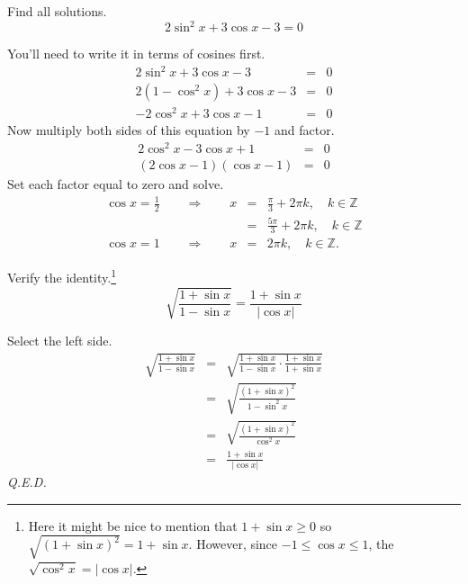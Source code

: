 \documentclass[12pt,addpoints, answers, fleqn]{exam}
\begin{document}
\begin{questions}
\question Find all solutions.
\[
2 \sin^2 x + 3 \cos x - 3 = 0
\]
\begin{solution} You'll need to write it in terms of cosines first.
\begin{eqnarray*}
2 \sin^2 x + 3 \cos x - 3 &=& 0\\
2 \left( 1 - \cos^2 x \right) + 3 \cos x - 3 &=& 0\\
-2 \cos^2 x  + 3 \cos x - 1 &=& 0
\end{eqnarray*}
Now multiply both sides of this equation by $-1$ and factor.
\begin{eqnarray*}
2\cos^2 x  - 3 \cos x + 1 &=& 0\\
\left(2 \cos x - 1  \right) \left(\cos x - 1 \right) &=& 0
\end{eqnarray*}
Set each factor equal to zero and solve.
\begin{eqnarray*}
\cos x = \frac{1}{2} \qquad \Rightarrow \qquad x &=& \boxed{\frac{\pi}{3} + 2 \pi k, \quad k \in \mathbb{Z}} \\
&=& \boxed{\frac{5\pi}{3} + 2 \pi k, \quad k \in \mathbb{Z}} \\
\cos x = 1 \qquad \Rightarrow \qquad x &=& \boxed{2 \pi k, \quad k \in \mathbb{Z}}.
\end{eqnarray*}
\end{solution}
\question Verify the identity.\footnote{Here it might be nice to mention that $1 + \sin x \geq 0$ so $\sqrt{\left(1 + \sin x\right)^2} = 1 + \sin x$. However, since $-1 \leq \cos x \leq 1$, the $\sqrt{\cos^2 x} = \left| \cos x\right|$.}
\[
\sqrt{\frac{1 + \sin x}{1 - \sin x}} = \frac{1 + \sin x}{\left| \cos x\right|}
\]
\begin{solution}
Select the left side.
\begin{eqnarray*}
\sqrt{\frac{1 + \sin x}{1 - \sin x}} &=& \sqrt{\frac{1 + \sin x}{1 - \sin x} \cdot \frac{1 + \sin x}{1 + \sin x}}\\
&=& \sqrt{\frac{\left(1 + \sin x\right)^2}{1 - \sin^2 x}}\\
&=& \sqrt{\frac{\left(1 + \sin x\right)^2}{\cos^2 x}}\\
&=& \frac{1 + \sin x}{\left| \cos x\right|}
\end{eqnarray*}
\emph{Q.E.D.}
\end{solution}




\end{questions}
\end{document}
